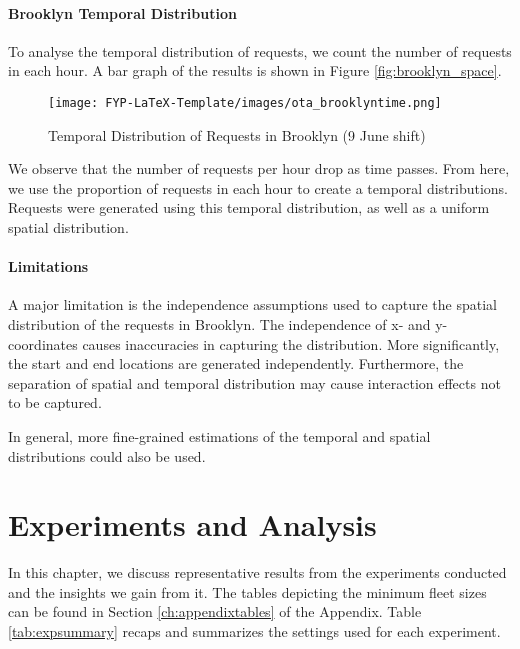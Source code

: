 \documentclass[urop]{socreport}
\begin{document}
\subsubsection{Brooklyn Temporal Distribution}

To analyse the temporal distribution of requests, we count the number of requests in each hour. A bar graph of the results is shown in Figure \ref{fig:brooklyn_space}. 

\begin{figure}[h]
    \centering
    \texttt{[image: FYP-LaTeX-Template/images/ota\_brooklyntime.png]}
    \caption{Temporal Distribution of Requests in Brooklyn (9 June shift)}
    \label{fig:brooklyn_time}
\end{figure}

We observe that the number of requests per hour drop as time passes. From here, we use the proportion of requests in each hour to create a temporal distributions. Requests were generated using this temporal distribution, as well as a uniform spatial distribution.

\subsubsection{Limitations}
A major limitation is the independence assumptions used to capture the spatial distribution of the requests in Brooklyn. The independence of x- and y-coordinates causes inaccuracies in capturing the distribution. More significantly, the start and end locations are generated independently. Furthermore, the separation of spatial and temporal distribution may cause interaction effects not to be captured.

In general, more fine-grained estimations of the temporal and spatial distributions could also be used.


\chapter{Experiments and Analysis}
\label{ch:exp}
In this chapter, we discuss representative results from the experiments conducted and the insights we gain from it. The tables depicting the minimum fleet sizes can be found in Section \ref{ch:appendixtables} of the Appendix. Table \ref{tab:expsummary} recaps and summarizes the settings used for each experiment.
\newline
\end{document}
